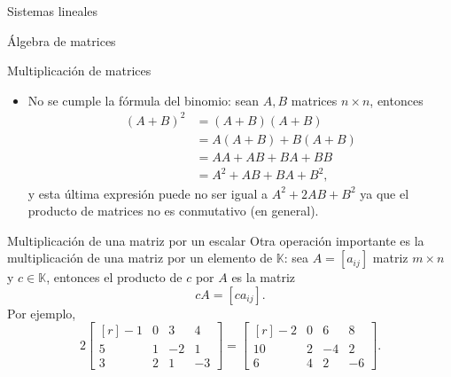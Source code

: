 \documentclass[a4paper,12pt,twoside,spanish,reqno]{amsbook}
\numberwithin{equation}{section}
\theoremstyle{definition}
\theoremstyle{remark}
\newcommand{\K}{\mathbb K}
\begin{document}
\begin{chapter}{Sistemas lineales}
\begin{section}{Álgebra de matrices}
\begin{subsection}{Multiplicación de matrices}
\begin{itemize}
                    \item No se cumple la fórmula del binomio: 	sean $A, B$ matrices $n \times n$, entonces		
                    \begin{align*}
                    (A+B)^2 &= (A+B)(A+B) \\&= A(A+B) + B(A+B) \\&= AA + AB + BA + BB \\&= A^2 + AB + BA + B^2,
                    \end{align*}
                    y  esta última expresión puede no ser  igual a $A^2 + 2AB + B^2$ ya que el producto de matrices no es conmutativo (en general). 
                \end{itemize}
        \end{subsection}
        
        
        \begin{subsection}{Multiplicación de una matriz por un escalar} Otra operación importante es la multiplicación de una matriz por un elemento de $\K$: sea $A=[a_{ij}]$ matriz $m \times n$ y $c \in \K$,  entonces el producto de $c$ por $A$ es la matriz
            $$
            cA=[ca_{ij}].
            $$ 
        Por ejemplo, 
        $$
        2\begin{bmatrix*}[r]
        -1& 0& 3 & 4\\
        5& 1& -2 & 1\\
        3& 2& 1 & -3
        \end{bmatrix*} =
        \begin{bmatrix*}[r]
        -2& 0& 6& 8\\
        10& 2& -4 & 2\\
        6& 4& 2 & -6
        \end{bmatrix*}.
        $$
        

\end{subsection}
\end{section}
\end{chapter}
\end{document}
